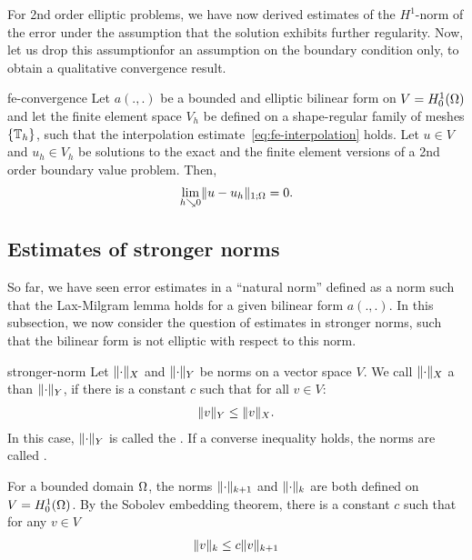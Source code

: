 \begin{intro}
  For 2nd order elliptic problems, we have now derived estimates of
  the $H^1$-norm of the error under the assumption that the solution
  exhibits further regularity. Now, let us drop this assumptionfor an
  assumption on the boundary condition only, to obtain a qualitative
  convergence result.
\end{intro}

\begin{Theorem}{fe-convergence}
  Let $a(.,.)$ be a bounded and elliptic bilinear form on
  $V = H^1_0(\Omega)$ and let the finite element space $V_h$ be
  defined on a shape-regular family of meshes $\{\mathbb T_h\}$, such that
  the interpolation estimate~\eqref{eq:fe-interpolation} holds. Let
  $u\in V$ and $u_h\in V_h$ be solutions to the exact and the finite
  element versions of a 2nd order boundary value problem. Then,
  \begin{gather}
    \lim_{h\searrow 0} \lVert u-u_h\rVert_{1;\Omega} = 0.
  \end{gather}
\end{Theorem}

\subsection{Estimates of stronger norms}

\begin{intro}
  So far, we have seen error estimates in a ``natural norm'' defined
  as a norm such that the Lax-Milgram lemma holds for a given bilinear
  form $a(.,.)$. In this subsection, we now consider the question of
  estimates in stronger norms, such that the bilinear form is not
  elliptic with respect to this norm.
\end{intro}

\begin{Definition}{stronger-norm}
  Let $\lVert\cdot\rVert_X$ and $\lVert\cdot\rVert_Y$ be norms on a vector space
  $V$. We call $\lVert\cdot\rVert_X$ a  than
  $\lVert\cdot\rVert_Y$, if there is a constant $c$ such that for all
  $v\in V$:
  \begin{gather}
    \lVert v\rVert_Y \le \lVert v\rVert_X.
  \end{gather}
  In this case, $\lVert\cdot\rVert_Y$ is called the . If a converse inequality holds, the norms are called
  .
\end{Definition}

\begin{example}
  For a bounded domain $\Omega$, the norms $\lVert\cdot\rVert_{k+1}$ and
  $\lVert\cdot\rVert_{k}$ are both defined on $V = H^1_0(\Omega)$. By the
  Sobolev embedding theorem, there is a constant $c$ such that for any
  $v\in V$
  \begin{gather*}
    \lVert v\rVert_{k} \le c \lVert v\rVert_{k+1}
  \end{gather*}
\end{example}

